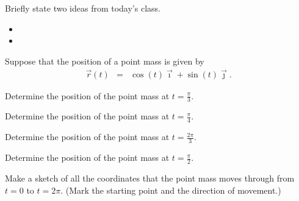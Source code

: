 \postClass

\begin{problem}
\item Briefly state two ideas from today's class.
  \begin{itemize}
  \item
  \item
  \end{itemize}
\item
  \begin{subproblem}
    \item
  \end{subproblem}
\end{problem}



\begin{problem}
\item Suppose that the position of a point mass is given by
  \begin{eqnarray*}
    \vec{r}(t) & = & \cos(t) \vec{\imath} + \sin(t) \vec{\jmath}.
  \end{eqnarray*}
  \begin{subproblem}
  \item Determine the position of the point mass at ${\displaystyle
      t=\frac{\pi}{3}}$.
    \vfill
  \item Determine the position of the point mass at ${\displaystyle
      t=\frac{\pi}{4}}$.
    \vfill
  \item Determine the position of the point mass at ${\displaystyle
      t=\frac{2\pi}{3}}$.
    \vfill
  \item Determine the position of the point mass at ${\displaystyle
      t=\frac{\pi}{2}}$.
    \vfill
    \clearpage
  \item Make a sketch of all the coordinates that the point mass moves
    through from $t=0$ to $t=2\pi$. (Mark the starting point and the
    direction of movement.)
    \vfill
  \end{subproblem}
\end{problem}


